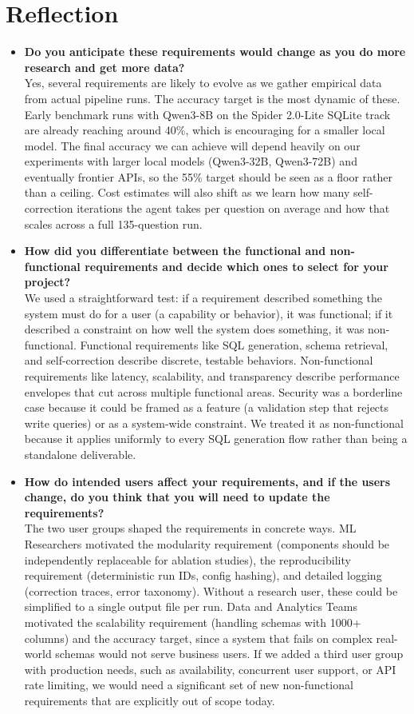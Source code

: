 \section{Reflection}
\begin{itemize}
    \item \textbf{Do you anticipate these requirements would change as you do more research and get more data?} \\
    Yes, several requirements are likely to evolve as we gather empirical data from actual pipeline runs. The accuracy target is the most dynamic of these. Early benchmark runs with Qwen3-8B on the Spider 2.0-Lite SQLite track are already reaching around 40\%, which is encouraging for a smaller local model. The final accuracy we can achieve will depend heavily on our experiments with larger local models (Qwen3-32B, Qwen3-72B) and eventually frontier APIs, so the 55\% target should be seen as a floor rather than a ceiling. Cost estimates will also shift as we learn how many self-correction iterations the agent takes per question on average and how that scales across a full 135-question run.

    \item \textbf{How did you differentiate between the functional and non-functional requirements and decide which ones to select for your project?} \\
    We used a straightforward test: if a requirement described something the system must do for a user (a capability or behavior), it was functional; if it described a constraint on how well the system does something, it was non-functional. Functional requirements like SQL generation, schema retrieval, and self-correction describe discrete, testable behaviors. Non-functional requirements like latency, scalability, and transparency describe performance envelopes that cut across multiple functional areas. Security was a borderline case because it could be framed as a feature (a validation step that rejects write queries) or as a system-wide constraint. We treated it as non-functional because it applies uniformly to every SQL generation flow rather than being a standalone deliverable.

    \item \textbf{How do intended users affect your requirements, and if the users change, do you think that you will need to update the requirements?} \\
    The two user groups shaped the requirements in concrete ways. ML Researchers motivated the modularity requirement (components should be independently replaceable for ablation studies), the reproducibility requirement (deterministic run IDs, config hashing), and detailed logging (correction traces, error taxonomy). Without a research user, these could be simplified to a single output file per run. Data and Analytics Teams motivated the scalability requirement (handling schemas with 1000+ columns) and the accuracy target, since a system that fails on complex real-world schemas would not serve business users. If we added a third user group with production needs, such as availability, concurrent user support, or API rate limiting, we would need a significant set of new non-functional requirements that are explicitly out of scope today.


\end{itemize}
